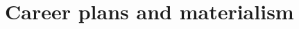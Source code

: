 \documentclass[11pt, headsepline]{article}
\begin{document}









\section*{Career plans and materialism}
\end{document}
